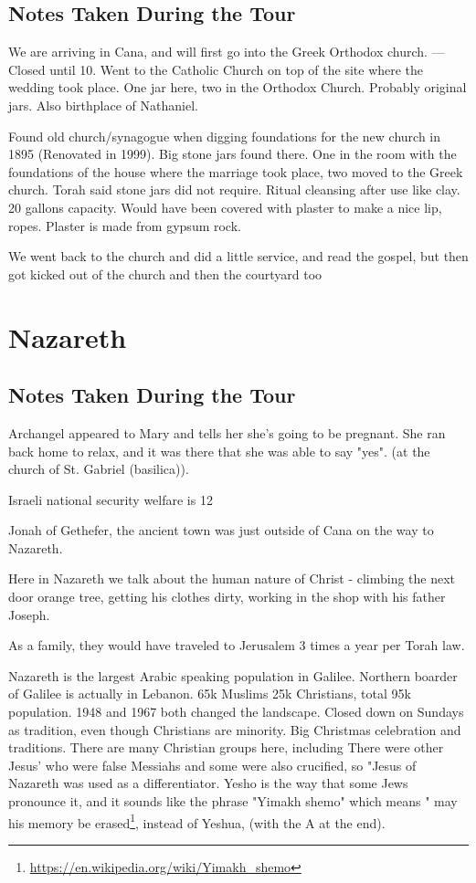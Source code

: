 \documentclass[letterpaper]{report}
\begin{document}
\subsection{Notes Taken During the Tour}
We are arriving in Cana, and will first go into the Greek Orthodox church. --- Closed until 10.
Went to the Catholic Church on top of the site where the wedding took place. One jar here, two in the Orthodox Church. Probably original jars. 
Also birthplace of Nathaniel.

Found old church/synagogue when digging foundations for the new church in 1895 (Renovated in 1999). Big stone jars found there. One in the room with the foundations of the house where the marriage took place, two moved to the Greek church.
Torah said stone jars did not require. Ritual cleansing after use like clay. 20 gallons capacity. Would have been covered with plaster to make a nice lip, ropes.
Plaster is made from gypsum rock.

We went back to the church and did a little service, and read the gospel, but then got kicked out of the church and then the courtyard too

\clearpage
\section{Nazareth}
\begin{multicols}{2}
	\mbox{}
\end{multicols}
\subsection{Notes Taken During the Tour}
Archangel appeared to Mary and tells her she's going to be pregnant. She ran back home to relax, and it was there that she was able to say "yes". (at the church of St. Gabriel (basilica)).

Israeli national security welfare is 12%

Jonah of Gethefer, the ancient town was just outside of Cana on the way to Nazareth.

Here in Nazareth we talk about the human nature of Christ - climbing the next door orange tree, getting his clothes dirty, working in the shop with his father Joseph.

As a family, they would have traveled to Jerusalem 3 times a year per Torah law.

Nazareth is the largest Arabic speaking population in Galilee.  Northern boarder of Galilee is actually in Lebanon.  65k Muslims 25k Christians, total 95k population. 1948 and 1967 both changed the landscape. Closed down on Sundays as tradition, even though Christians are minority.  Big Christmas celebration and traditions.
There are many Christian groups here, including 
There were other Jesus' who were false Messiahs and some were also crucified, so "Jesus of Nazareth was used as a differentiator. Yesho is the way that some Jews pronounce it, and it sounds like the phrase "Yimakh shemo" which means " may his memory be erased\footnote{\url{https://en.wikipedia.org/wiki/Yimakh_shemo}
	}, instead of Yeshua, (with the A at the end).
\end{document}
